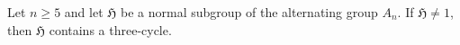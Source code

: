 Let $n \geq 5$ and let $\mathfrak{H}$ be a normal subgroup of the alternating group $A_n$. If $\mathfrak{H} \neq 1$, then $\mathfrak{H}$ contains a three-cycle.
